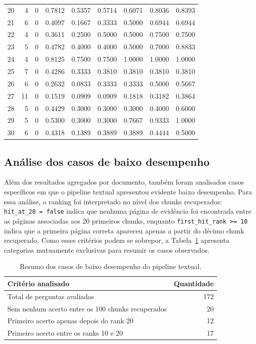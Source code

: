 \begin{table}[htbp]
{\begin{tabular}{r r r r r r r r r}
    20 & 4 & 0 & 0.7812 & 0.5357 & 0.5714 & 0.6071 & 0.8036 & 0.8393 \\
    21 & 6 & 0 & 0.4097 & 0.1667 & 0.3333 & 0.5000 & 0.6944 & 0.6944 \\
    22 & 4 & 0 & 0.3611 & 0.2500 & 0.5000 & 0.5000 & 0.7500 & 0.7500 \\
    23 & 5 & 0 & 0.4782 & 0.4000 & 0.4000 & 0.5000 & 0.7000 & 0.8833 \\
    24 & 4 & 0 & 0.8125 & 0.7500 & 0.7500 & 1.0000 & 1.0000 & 1.0000 \\
    25 & 7 & 0 & 0.4286 & 0.3333 & 0.3810 & 0.3810 & 0.3810 & 0.3810 \\
    26 & 6 & 0 & 0.2632 & 0.0833 & 0.3333 & 0.3333 & 0.5000 & 0.5667 \\
    27 & 11 & 0 & 0.1519 & 0.0909 & 0.0909 & 0.1818 & 0.3182 & 0.3864 \\
    28 & 5 & 0 & 0.4429 & 0.3000 & 0.3000 & 0.3000 & 0.4000 & 0.6000 \\
    29 & 5 & 0 & 0.5300 & 0.3000 & 0.3000 & 0.7667 & 0.9333 & 1.0000 \\
    30 & 6 & 0 & 0.4318 & 0.1389 & 0.3889 & 0.3889 & 0.4444 & 0.5000 \\
    \bottomrule
    \end{tabular}
    }
    \end{table}
    



\subsection{Análise dos casos de baixo desempenho}

Além dos resultados agregados por documento, também foram analisados casos específicos em que o pipeline textual apresentou evidente baixo desempenho. Para essa análise, o ranking foi interpretado no nível dos chunks recuperados: \texttt{hit\_at\_20 = false} indica que nenhuma página de evidência foi encontrada entre as páginas associadas aos 20 primeiros chunks, enquanto \texttt{first\_hit\_rank >= 10} indica que a primeira página correta apareceu apenas a partir do décimo chunk recuperado. Como esses critérios podem se sobrepor, a Tabela~\ref{tab:baixo-desempenho-resumo} apresenta categorias mutuamente exclusivas para resumir os casos observados.

\begin{table}[htbp]
\centering
\caption{Resumo dos casos de baixo desempenho do pipeline textual.}
\label{tab:baixo-desempenho-resumo}
\small
\begin{tabular}{p{9.2cm}r}
\toprule
\textbf{Critério analisado} & \textbf{Quantidade} \\
\midrule
Total de perguntas avaliadas & 172 \\
Sem nenhum acerto entre os 100 chunks recuperados & 20 \\
Primeiro acerto apenas depois do rank 20 & 12 \\
Primeiro acerto entre os ranks 10 e 20 & 17 \\
\bottomrule
\end{tabular}
\end{table}

